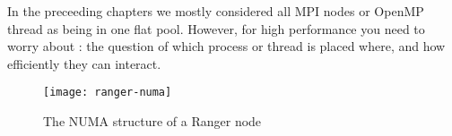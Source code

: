 

In the preceeding chapters we mostly considered all MPI nodes or
OpenMP thread as being in one flat pool.
However, for high performance you need to worry about :
the question of which process or thread is placed where, and how
efficiently they can interact.

\begin{figure}[ht]
  \texttt{[image: ranger-numa]}
  \caption{The NUMA structure of a Ranger node}
  \label{fig:ranger-numa}
\end{figure}

